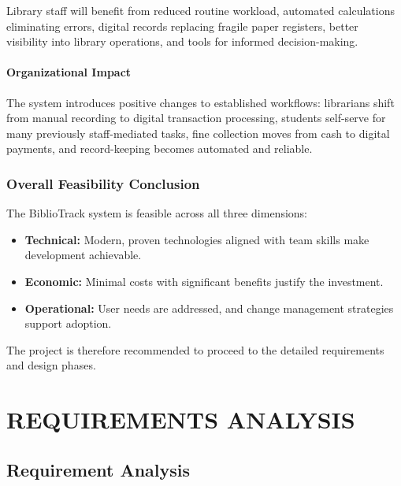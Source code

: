 \documentclass[12pt,a4paper]{report}
\begin{document}
Library staff will benefit from reduced routine workload, automated calculations eliminating errors, digital records replacing fragile paper registers, better visibility into library operations, and tools for informed decision-making.

\subsubsection{Organizational Impact}

The system introduces positive changes to established workflows: librarians shift from manual recording to digital transaction processing, students self-serve for many previously staff-mediated tasks, fine collection moves from cash to digital payments, and record-keeping becomes automated and reliable.

\subsection{Overall Feasibility Conclusion}

The BiblioTrack system is feasible across all three dimensions:

\begin{itemize}
    \item \textbf{Technical:} Modern, proven technologies aligned with team skills make development achievable.
    \item \textbf{Economic:} Minimal costs with significant benefits justify the investment.
    \item \textbf{Operational:} User needs are addressed, and change management strategies support adoption.
\end{itemize}

The project is therefore recommended to proceed to the detailed requirements and design phases.



\newpage
\chapter{REQUIREMENTS ANALYSIS}

\section{Requirement Analysis}
\label{sec:requirements}
\end{document}
